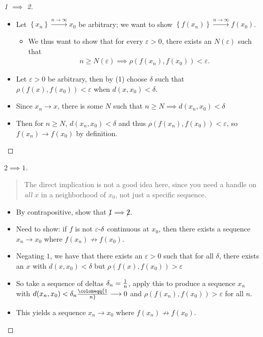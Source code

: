 \begin{solution}

\envlist

\begin{proof}[1 $\implies$ 2]

\envlist

\begin{itemize}
\tightlist
\item
  Let \(\left\{{x_n}\right\} \overset{n\to\infty}\to x_0\) be arbitrary;
  we want to show
  \(\left\{{f(x_n)}\right\}\overset{n\to\infty}\to f(x_0)\).

  \begin{itemize}
  \tightlist
  \item
    We thus want to show that for every \({\varepsilon}>0\), there
    exists an \(N({\varepsilon})\) such that
    \begin{align*}n\geq N({\varepsilon}) \implies \rho(f(x_n),  f(x_0)) < {\varepsilon}.\end{align*}
  \end{itemize}
\item
  Let \({\varepsilon}>0\) be arbitrary, then by (1) choose \(\delta\)
  such that \(\rho(f(x), f(x_0)) < {\varepsilon}\) when
  \(d(x, x_0) < \delta\).
\item
  Since \(x_n\to x\), there is some \(N\) such that
  \(n\geq N \implies d(x_n, x_0) < \delta\)
\item
  Then for \(n\geq N\), \(d(x_n, x_0) < \delta\) and thus
  \(\rho(f(x_n), f(x_0)) < {\varepsilon}\), so \(f(x_n)\to f(x_0)\) by
  definition.
\end{itemize}

\end{proof}

\begin{proof}[$2\implies 1$]

\begin{quote}
The direct implication is not a good idea here, since you need a handle
on \emph{all} \(x\) in a neighborhood of \(x_0\), not just a specific
sequence.
\end{quote}

\begin{itemize}
\tightlist
\item
  By contrapositive, show that \(\not 1\implies \not 2\).
\item
  Need to show: if \(f\) is not \({\varepsilon}{\hbox{-}}\delta\)
  continuous at \(x_0\), then there exists a sequence \(x_n\to x_0\)
  where \(f(x_n)\not\to f(x_0)\).
\item
  Negating \(1\), we have that there exists an \({\varepsilon}>0\) such
  that for all \(\delta\), there exists an \(x\) with
  \(d(x, x_0) < \delta\) but \(\rho(f(x), f(x_0))>{\varepsilon}\)
\item
  So take a sequence of deltas \(\delta_n = {1\over n}\), apply this to
  produce a sequence \(x_n\) with
  \(d(x_n, x_0) < \delta_n \coloneqq{1\over n} \longrightarrow 0\) and
  \(\rho(f(x_n), f(x_0)) > {\varepsilon}\) for all \(n\).
\item
  This yields a sequence \(x_n \to x_0\) where
  \(f(x_n) \not\to f(x_0)\).
\end{itemize}


\end{proof}
\end{solution}
